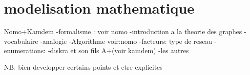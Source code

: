 \section{modelisation mathematique}
Nomo+Kamdem
-formalisme : voir nomo
	-introduction a la theorie des graphes
	-vocabulaire
	-analogie
-Algorithme voir:nomo
-facteurs: type de reseau
-enumerations:
-diskra et son fils A+(voir kamdem)
-les autres

NB: bien developper certains points et etre explicites

